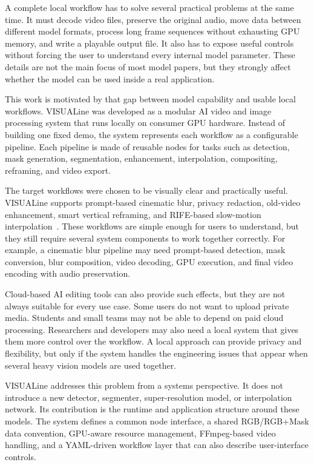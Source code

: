 \documentclass[11pt,a4paper]{article}
\begin{document}
A complete local workflow has to solve several practical problems at the same time. It must decode video files, preserve the original audio, move data between different model formats, process long frame sequences without exhausting GPU memory, and write a playable output file. It also has to expose useful controls without forcing the user to understand every internal model parameter. These details are not the main focus of most model papers, but they strongly affect whether the model can be used inside a real application.

This work is motivated by that gap between model capability and usable local workflows. VISUALine was developed as a modular AI video and image processing system that runs locally on consumer GPU hardware. Instead of building one fixed demo, the system represents each workflow as a configurable pipeline. Each pipeline is made of reusable nodes for tasks such as detection, mask generation, segmentation, enhancement, interpolation, compositing, reframing, and video export.

The target workflows were chosen to be visually clear and practically useful. VISUALine supports prompt-based cinematic blur, privacy redaction, old-video enhancement, smart vertical reframing, and RIFE-based slow-motion interpolation~\cite{huang2022rife}. These workflows are simple enough for users to understand, but they still require several system components to work together correctly. For example, a cinematic blur pipeline may need prompt-based detection, mask conversion, blur composition, video decoding, GPU execution, and final video encoding with audio preservation.

Cloud-based AI editing tools can also provide such effects, but they are not always suitable for every use case. Some users do not want to upload private media. Students and small teams may not be able to depend on paid cloud processing. Researchers and developers may also need a local system that gives them more control over the workflow. A local approach can provide privacy and flexibility, but only if the system handles the engineering issues that appear when several heavy vision models are used together.

VISUALine addresses this problem from a systems perspective. It does not introduce a new detector, segmenter, super-resolution model, or interpolation network. Its contribution is the runtime and application structure around these models. The system defines a common node interface, a shared RGB/RGB+Mask data convention, GPU-aware resource management, FFmpeg-based video handling, and a YAML-driven workflow layer that can also describe user-interface controls.
\end{document}
